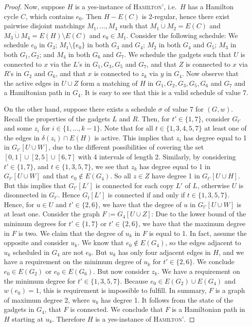 \documentclass[runningheads]{llncs}
\numberwithin{equation}{section}
\newcommand{\set}[1]{\{ #1 \}}
\newcommand{\fromto}[2]{\set{#1, \ldots, #2}}
\newcommand{\dotunion}{\mathbin{\dot{\cup}}}
\begin{document}
\begin{proof}
Now, suppose $H$ is a yes-instance of \textsc{Hamilton'}, i.e.\ $H$ has a Hamilton cycle $C$, which contains $e_0$. Then $H - E(C)$ is 2-regular, hence there exist pairwise disjoint matchings $M_1, \ldots, M_4$ such that $M_1 \dotunion M_2 = E(C)$ and $M_3 \dotunion M_4 = E(H) \setminus E(C)$ and $e_0 \in M_1$. Consider the following schedule: We schedule $e_0$ in $G_3$; $M_1 \setminus \set{e_0}$ in both $G_3$ and $G_4$; $M_2$ in both $G_4$ and $G_5$; $M_3$ in both $G_1, G_2$; and $M_4$ in both $G_6$ and $G_7$. We schedule the gadgets such that $U$ is connected to $x$ via the $L$'s in $G_1, G_3, G_5$ and $G_7$, and that $Z$ is connected to $x$ via $R$'s in $G_2$ and $G_6$, and that $x$ is connected to $z_k$ via $y$ in $G_4$. Now observe that the active edges in $U \cup Z$ form a matching of $H$ in $G_1, G_2, G_3, G_5, G_6$ and $G_7$ and a Hamiltonian path in $G_4$. It is easy to see that this is a valid schedule of value 7. 

On the other hand, suppose there exists a schedule $\sigma$ of value 7 for $(G, w)$.
Recall the properties of the gadgets $L$ and $R$. Then, for $t' \in \set{1, 7}$, consider $G_{t'}$ and some $z_i$ for $i \in \fromto{1}{k-1}$. Note that for all $t \in \set{1, 3, 4, 5, 7}$ at least one of the edges in $\delta(z_i) \cap E(H)$ is active. This implies that $z_i$ has degree equal to 1 in $G_{t'}[U \cup W]$, due to the different possibilities of covering the set $[0, 1] \cup [2, 5] \cup [6, 7]$ with 4 intervals of length 2. Similarly, by considering $t' \in \set{1, 7}$, and $t \in \set{1, 3, 5, 7}$, we see that $z_k$ has degree equal to 1 in $G_{t'}[U \cup W]$ and that $e_0 \not \in E(G_{4})$. So all $z \in Z$ have degree 1 in $G_{t'}[U \cup H]$. But this implies that $G_{t'}[L']$ is connected for each copy $L'$ of $L$, otherwise $U$ is disonnected in $G_{t'}$. Hence $G_t[L']$ is connected if and only if $t \in \set{1, 3, 5, 7}$. Hence, for $u \in U$ and $t' \in \set{2, 6}$, we have that the degree of $u$ in $G_{t'}[U \cup W]$ is at least one. Consider the graph $F := G_{4}[U \cup Z]$: Due to the lower bound of the minimum degrees for $t' \in \set{1, 7}$ or $t' \in \set{2, 6}$, we have that the maximum degree in $F$ is two. We claim that the degree of $u_k$ in $F$ is equal to 1. In fact, assume the opposite and consider $u_k$. We know that $e_0 \not\in E(G_4)$, so the edges adjacent to $u_k$ scheduled in $G_4$ are not $e_0$. But $u_k$ has only four adjacent edges in $H$, and we have a requirement on the minimum degree of $u_k$ for $t' \in \set{2, 6}$. We conclude $e_0 \in E(G_2)$ or $e_0 \in E(G_6)$. But now consider $z_k$. We have a requirement on the minimum degree for $t' \in \set{1, 3, 5, 7}$. Because $e_0 \in E(G_2) \cup E(G_4)$ and $w(e_0) = 1$, this is requirement is impossible to fulfill.
In summary, $F$ is a graph of maximum degree 2, where $u_k$ has degree 1. It follows from the state of the gadgets in $G_4$, that $F$ is connected. We conclude that $F$ is a Hamiltonian path in $H$ starting at $u_k$. Therefore $H$ is a yes-instance of \textsc{Hamilton'}.


\end{proof}
\end{document}
